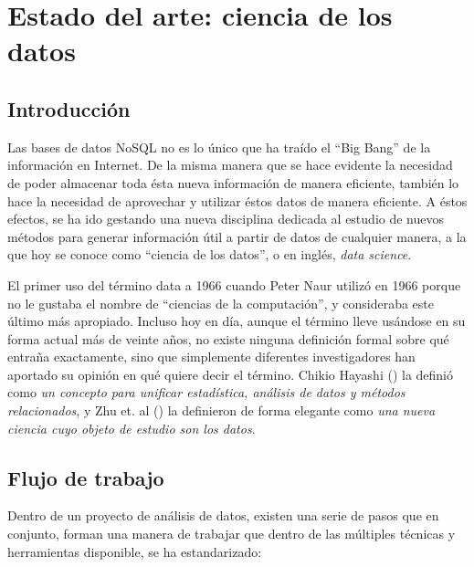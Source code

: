 \section{Estado del arte: ciencia de los datos}
\label{sec:state_dataScience}

\subsection{Introducción}
\label{subsec:state_dataScience_intro}

Las bases de datos NoSQL no es lo único que ha traído el ``Big Bang'' de la
información en Internet. De la misma manera que se hace evidente la necesidad de
poder almacenar toda ésta nueva información de manera eficiente, también lo hace
la necesidad de aprovechar y utilizar éstos datos de manera eficiente. A éstos
efectos, se ha ido gestando una nueva disciplina dedicada al estudio de nuevos métodos para generar información útil a partir de datos de
cualquier manera, a la que hoy se conoce como ``ciencia de los datos'', o en
inglés, \emph{data science}.

El primer uso del término data a 1966 cuando Peter Naur utilizó en 1966
porque no le gustaba el nombre de  ``ciencias de la computación'', y consideraba
este último más apropiado. Incluso hoy en día, aunque el término lleve usándose en su forma actual más de veinte
años, no existe ninguna definición formal sobre qué entraña exactamente, sino
que simplemente diferentes investigadores han aportado su opinión en
qué quiere decir el término. Chikio Hayashi (\cite{Hayashi1998}) la definió como
\emph{un concepto para unificar estadística, análisis de datos y métodos
  relacionados}, y Zhu et. al (\cite{Zhu2011}) la definieron de forma elegante
como \emph{una nueva ciencia cuyo objeto de estudio son los datos}. 


\subsection{Flujo de trabajo}
\label{subsec:state_dataScience_workflow}

Dentro de un proyecto de análisis de datos, existen una serie de pasos que en
conjunto, forman una manera de trabajar que dentro de las múltiples técnicas y
herramientas disponible, se ha estandarizado:

